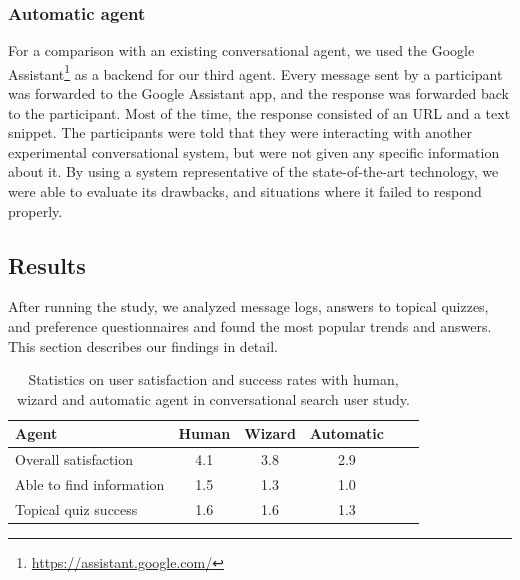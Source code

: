 \subsubsection{Automatic agent}
\label{section:conversation:user-study:design:google}
For a comparison with an existing conversational agent, we used the Google Assistant\footnote{\href{url}{https://assistant.google.com/}} as a backend for our third agent.
Every message sent by a participant was forwarded to the Google Assistant app, and the response was forwarded back to the participant.
Most of the time, the response consisted of an URL and a text snippet. The participants were told that they were interacting with another experimental conversational system, but were not given any specific information about it.
By using a system representative of the state-of-the-art technology, we were able to evaluate its drawbacks, and situations where it failed to respond properly.

\subsection{Results}
\label{section:conversation:user-study:results}

After running the study, we analyzed message logs, answers to topical quizzes, and preference questionnaires and found the most popular trends and answers.
This section describes our findings in detail.
\begin{table}
  \centering
    \begin{tabular}{l*{4}{c}r}
    Agent                      & Human & Wizard & Automatic \\ 
    \hline
    Overall satisfaction       & 4.1 & 3.8 & 2.9 \\ 
    Able to find information   & 1.5 & 1.3 & 1.0 \\ 
    Topical quiz success       & 1.6 & 1.6 & 1.3 \\
    \end{tabular}
  \caption{Statistics on user satisfaction and success rates with human, wizard and automatic agent in conversational search user study.}
  \label{table:conversation:user-study:results}
\end{table}

